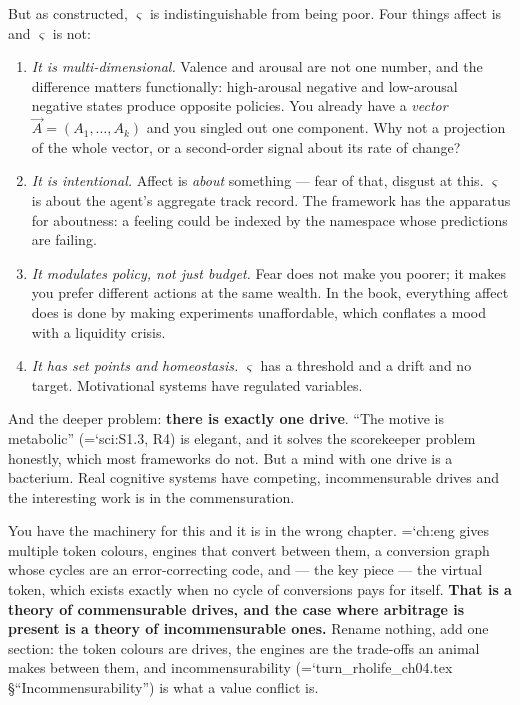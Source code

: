 \documentclass[11pt,letterpaper]{article}
\newcommand{\loc}[1]{{\small\ttfamily\color{accent}\hyphenchar\font=`\-\relax #1}}
\newcommand{\fnd}[1]{\textbf{\color{warn}#1}}
\begin{document}
But as constructed, $\varsigma$ is indistinguishable from being poor.
Four things affect is and $\varsigma$ is not:

\begin{enumerate}[leftmargin=1.4em,itemsep=3pt]
\item \emph{It is multi-dimensional.} Valence and arousal are not one
      number, and the difference matters functionally: high-arousal
      negative and low-arousal negative states produce opposite
      policies. You already have a \emph{vector} $\vec{A} =
      (A_1,\dots,A_k)$ and you singled out one component. Why not a
      projection of the whole vector, or a second-order signal about
      its rate of change?
\item \emph{It is intentional.} Affect is \emph{about} something ---
      fear of that, disgust at this. $\varsigma$ is about the agent's
      aggregate track record. The framework has the apparatus for
      aboutness: a feeling could be indexed by the namespace whose
      predictions are failing.
\item \emph{It modulates policy, not just budget.} Fear does not make
      you poorer; it makes you prefer different actions at the same
      wealth. In the book, everything affect does is done by making
      experiments unaffordable, which conflates a mood with a
      liquidity crisis.
\item \emph{It has set points and homeostasis.} $\varsigma$ has a
      threshold and a drift and no target. Motivational systems have
      regulated variables.
\end{enumerate}

And the deeper problem: \fnd{there is exactly one drive}. ``The motive
is metabolic'' (\loc{sci:S1.3}, R4) is elegant, and it solves the
scorekeeper problem honestly, which most frameworks do not. But a mind
with one drive is a bacterium. Real cognitive systems have competing,
incommensurable drives and the interesting work is in the
commensuration.

You have the machinery for this and it is in the wrong chapter.
\loc{ch:eng} gives multiple token colours, engines that convert between
them, a conversion graph whose cycles are an error-correcting code, and
--- the key piece --- the virtual token, which exists exactly when no
cycle of conversions pays for itself. \fnd{That is a theory of
commensurable drives, and the case where arbitrage is present is a
theory of incommensurable ones.} Rename nothing, add one section: the
token colours are drives, the engines are the trade-offs an animal
makes between them, and incommensurability
(\loc{turn\_rholife\_ch04.tex} \S``Incommensurability'') is what a
value conflict is.
\end{document}
